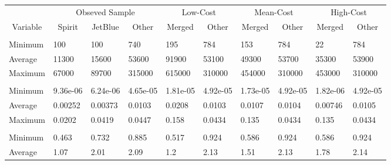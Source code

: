 
\begin{tabular}[t]{llllllllll}
\toprule
\multicolumn{1}{c}{ } & \multicolumn{3}{c}{Obseved Sample} & \multicolumn{2}{c}{Low-Cost} & \multicolumn{2}{c}{Mean-Cost} & \multicolumn{2}{c}{High-Cost} \\
\cmidrule(l{3pt}r{3pt}){2-4} \cmidrule(l{3pt}r{3pt}){5-6} \cmidrule(l{3pt}r{3pt}){7-8} \cmidrule(l{3pt}r{3pt}){9-10}
\multicolumn{1}{c}{Variable} & \multicolumn{1}{c}{Spirit} & \multicolumn{1}{c}{JetBlue} & \multicolumn{1}{c}{Other} & \multicolumn{1}{c}{Merged} & \multicolumn{1}{c}{Other} & \multicolumn{1}{c}{Merged} & \multicolumn{1}{c}{Other} & \multicolumn{1}{c}{Merged} & \multicolumn{1}{c}{Other} \\
\cmidrule(l{3pt}r{3pt}){1-1} \cmidrule(l{3pt}r{3pt}){2-2} \cmidrule(l{3pt}r{3pt}){3-3} \cmidrule(l{3pt}r{3pt}){4-4} \cmidrule(l{3pt}r{3pt}){5-5} \cmidrule(l{3pt}r{3pt}){6-6} \cmidrule(l{3pt}r{3pt}){7-7} \cmidrule(l{3pt}r{3pt}){8-8} \cmidrule(l{3pt}r{3pt}){9-9} \cmidrule(l{3pt}r{3pt}){10-10}
\addlinespace[0.3em]
\multicolumn{10}{l}{\textbf{Passengers}}\\
\hspace{1em}Minimum & 100 & 100 & 740 & 195 & 784 & 153 & 784 & 22 & 784\\
\hspace{1em}Average & 11300 & 15600 & 53600 & 91900 & 53100 & 49300 & 53700 & 35300 & 53900\\
\hspace{1em}Maximum & 67000 & 89700 & 315000 & 615000 & 310000 & 454000 & 310000 & 453000 & 310000\\
\addlinespace[0.3em]
\multicolumn{10}{l}{\textbf{Market Share}}\\
\hspace{1em}Minimum & 9.36e-06 & 6.24e-06 & 4.65e-05 & 1.81e-05 & 4.92e-05 & 1.73e-05 & 4.92e-05 & 1.82e-06 & 4.92e-05\\
\hspace{1em}Average & 0.00252 & 0.00373 & 0.0103 & 0.0208 & 0.0103 & 0.0107 & 0.0104 & 0.00746 & 0.0105\\
\hspace{1em}Maximum & 0.0202 & 0.0419 & 0.0447 & 0.158 & 0.0434 & 0.135 & 0.0434 & 0.135 & 0.0434\\
\addlinespace[0.3em]
\multicolumn{10}{l}{\textbf{Prices}}\\
\hspace{1em}Minimum & 0.463 & 0.732 & 0.885 & 0.517 & 0.924 & 0.586 & 0.924 & 0.586 & 0.924\\
\hspace{1em}Average & 1.07 & 2.01 & 2.09 & 1.2 & 2.13 & 1.51 & 2.13 & 1.78 & 2.14\\

\end{tabular}
